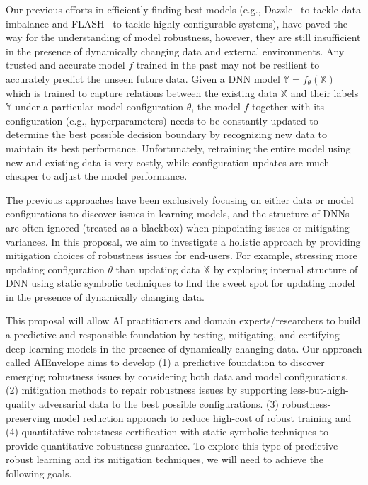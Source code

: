 Our previous efforts in efficiently finding best models (e.g., Dazzle~\cite{shumsr22} to tackle data imbalance and FLASH~\cite{nair2018finding} to tackle highly configurable systems), have paved the way for the understanding of model robustness, however, they are still insufficient in the presence of dynamically changing data and external environments.
Any trusted and accurate model $f$ trained in the past may not be resilient to accurately predict the unseen future data. 
Given a DNN model $\mathbb{Y} = f_\theta(\mathbb{X})$ which is trained to capture relations between the existing data $\mathbb{X}$ and their labels $\mathbb{Y}$ under a particular model configuration $\theta$, the model $f$ together with its configuration (e.g., hyperparameters) needs to be constantly updated to determine the best possible decision boundary by recognizing new data to maintain its best performance.
Unfortunately, retraining the entire model using new and existing data is very costly, while configuration updates are much cheaper to adjust the model performance.

The previous approaches have been exclusively focusing on either data or model configurations to discover issues in learning models, and the structure of DNNs are often ignored (treated as a blackbox) when pinpointing issues or mitigating variances.
In this proposal, we aim to investigate a holistic approach by providing mitigation choices of robustness issues for end-users. For example, stressing more updating configuration $\theta$ than updating data $\mathbb{X}$ by exploring internal structure of DNN using static symbolic techniques to find the sweet spot for updating model in the presence of dynamically  changing data. 

This proposal will allow AI practitioners and domain experts/researchers to build a predictive and responsible foundation by testing, mitigating, and certifying deep learning models in the presence of dynamically changing data. 
Our approach called \mbox{AIEnvelope} aims to develop (1) a predictive foundation to discover emerging robustness issues by considering both data and model configurations.
(2) mitigation methods to repair robustness issues by supporting less-but-high-quality adversarial data to the best possible configurations.
(3) robustness-preserving model reduction approach to reduce high-cost of robust training and (4) quantitative robustness certification with static symbolic techniques to provide quantitative robustness guarantee.
To explore this type of predictive robust learning and its mitigation techniques, we will need to achieve the following goals. 

